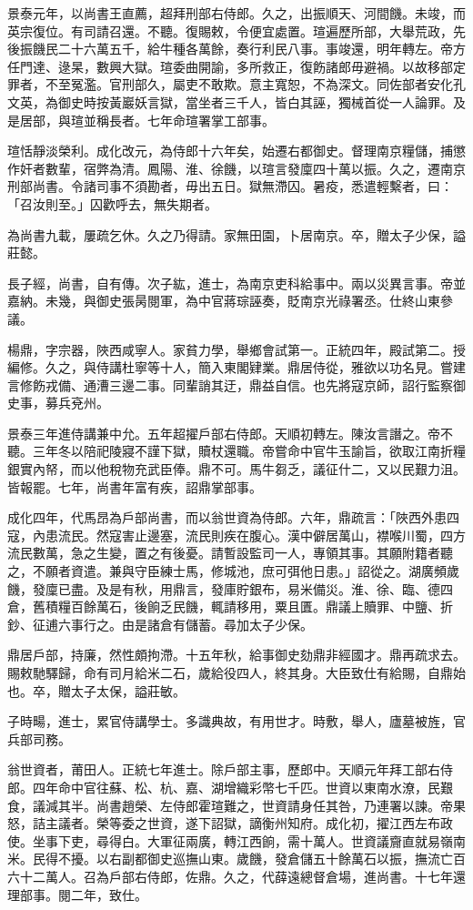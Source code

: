 \begin{pinyinscope}
景泰元年，以尚書王直薦，超拜刑部右侍郎。久之，出振順天、河間饑。未竣，而英宗復位。有司請召還。不聽。復賜敕，令便宜處置。瑄遍歷所部，大舉荒政，先後振饑民二十六萬五千，給牛種各萬餘，奏行利民八事。事竣還，明年轉左。帝方任門達、逯杲，數興大獄。瑄委曲開諭，多所救正，復飭諸郎毋避禍。以故移部定罪者，不至冤濫。官刑部久，屬吏不敢欺。意主寬恕，不為深文。同佐部者安化孔文英，為御史時按黃巖妖言獄，當坐者三千人，皆白其誣，獨械首從一人論罪。及是居部，與瑄並稱長者。七年命瑄署掌工部事。

瑄恬靜淡榮利。成化改元，為侍郎十六年矣，始遷右都御史。督理南京糧儲，捕懲作奸者數輩，宿弊為清。鳳陽、淮、徐饑，以瑄言發廩四十萬以振。久之，遷南京刑部尚書。令諸司事不須勘者，毋出五日。獄無滯囚。暑疫，悉遣輕繫者，曰：「召汝則至。」囚歡呼去，無失期者。

為尚書九載，屢疏乞休。久之乃得請。家無田園，卜居南京。卒，贈太子少保，謚莊懿。

長子經，尚書，自有傳。次子紘，進士，為南京吏科給事中。兩以災異言事。帝並嘉納。未幾，與御史張昺閱軍，為中官蔣琮誣奏，貶南京光祿署丞。仕終山東參議。

楊鼎，字宗器，陜西咸寧人。家貧力學，舉鄉會試第一。正統四年，殿試第二。授編修。久之，與侍講杜寧等十人，簡入東閣肄業。鼎居侍從，雅欲以功名見。嘗建言修飭戎備、通漕三邊二事。同輩誚其迂，鼎益自信。也先將寇京師，詔行監察御史事，募兵兗州。

景泰三年進侍講兼中允。五年超擢戶部右侍郎。天順初轉左。陳汝言譖之。帝不聽。三年冬以陪祀陵寢不謹下獄，贖杖還職。帝嘗命中官牛玉諭旨，欲取江南折糧銀實內帑，而以他稅物充武臣俸。鼎不可。馬牛芻乏，議征什二，又以民艱力沮。皆報罷。七年，尚書年富有疾，詔鼎掌部事。

成化四年，代馬昂為戶部尚書，而以翁世資為侍郎。六年，鼎疏言：「陜西外患四寇，內患流民。然寇害止邊塞，流民則疾在腹心。漢中僻居萬山，襟喉川蜀，四方流民數萬，急之生變，置之有後憂。請暫設監司一人，專領其事。其願附籍者聽之，不願者資遣。兼與守臣練士馬，修城池，庶可弭他日患。」詔從之。湖廣頻歲饑，發廩已盡。及是有秋，用鼎言，發庫貯銀布，易米備災。淮、徐、臨、德四倉，舊積糧百餘萬石，後餉乏民饑，輒請移用，粟且匱。鼎議上贖罪、中鹽、折鈔、征逋六事行之。由是諸倉有儲蓄。尋加太子少保。

鼎居戶部，持廉，然性頗拘滯。十五年秋，給事御史劾鼎非經國才。鼎再疏求去。賜敕馳驛歸，命有司月給米二石，歲給役四人，終其身。大臣致仕有給賜，自鼎始也。卒，贈太子太保，謚莊敏。

子時畼，進士，累官侍講學士。多識典故，有用世才。時敷，舉人，廬墓被旌，官兵部司務。

翁世資者，莆田人。正統七年進士。除戶部主事，歷郎中。天順元年拜工部右侍郎。四年命中官往蘇、松、杭、嘉、湖增織彩幣七千匹。世資以東南水潦，民艱食，議減其半。尚書趙榮、左侍郎霍瑄難之，世資請身任其咎，乃連署以諫。帝果怒，詰主議者。榮等委之世資，遂下詔獄，謫衡州知府。成化初，擢江西左布政使。坐事下吏，尋得白。大軍征兩廣，轉江西餉，需十萬人。世資議齎直就易嶺南米。民得不擾。以右副都御史巡撫山東。歲饑，發倉儲五十餘萬石以振，撫流亡百六十二萬人。召為戶部右侍郎，佐鼎。久之，代薛遠總督倉場，進尚書。十七年還理部事。閱二年，致仕。


\end{pinyinscope}
